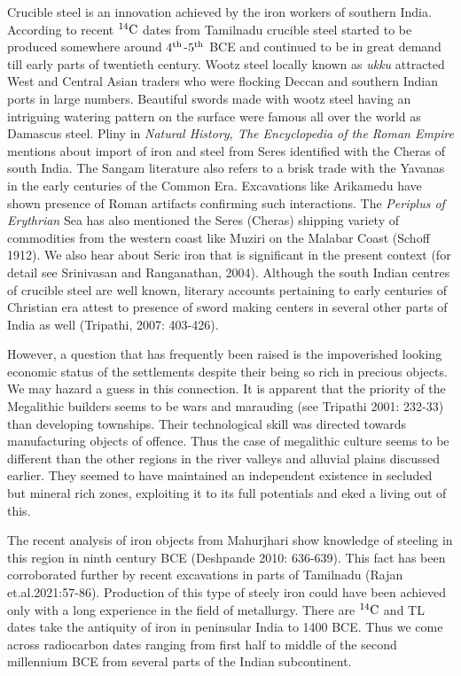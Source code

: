 Crucible steel is an innovation achieved by the iron workers of southern India. According to recent $^{14}{\rm C}$ dates from Tamilnadu crucible steel started to be produced somewhere around $4^{\rm th}$-$5^{\rm th}$ BCE and continued to be in great demand till early parts of twentieth century. Wootz steel locally known as \textit{ukku} attracted West and Central Asian traders who were flocking Deccan and southern Indian ports in large numbers. Beautiful swords made with wootz steel having an intriguing watering pattern on the surface were famous all over the world as Damascus steel. Pliny in \textit{Natural History, The Encyclopedia of the Roman Empire} mentions about import of iron and steel from Seres identified with the Cheras of south India. The Sangam literature also refers to a brisk trade with the Yavanas in the early centuries of the Common Era. Excavations like Arikamedu have shown presence of Roman artifacts confirming such interactions. The \textit{Periplus of Erythrian} Sea has also mentioned the Seres (Cheras) shipping variety of commodities from the western coast like Muziri on the Malabar Coast (Schoff 1912). We also hear about Seric iron that is significant in the present context (for detail see Srinivasan and Ranganathan, 2004). Although the south Indian centres of crucible steel are well known, literary accounts pertaining to early centuries of Christian era attest to presence of sword making centers in several other parts of India as well (Tripathi, 2007: 403-426). 

However, a question that has frequently been raised is the impoverished looking economic status of the settlements despite their being so rich in precious objects. We may hazard a guess in this connection. It is apparent that the priority of the Megalithic builders seems to be wars and marauding (see Tripathi 2001: 232-33) than developing townships. Their technological skill was directed towards manufacturing objects of offence. Thus the case of megalithic culture seems to be different than the other regions in the river valleys and alluvial plains discussed earlier. They seemed to have maintained an independent existence in secluded but mineral rich zones, exploiting it to its full potentials and eked a living out of this.

The recent analysis of iron objects from Mahurjhari show knowledge of steeling in this region in ninth century BCE (Deshpande 2010: 636-639). This fact has been corroborated further by recent excavations in parts of Tamilnadu (Rajan et.al.2021:57-86). Production of this type of steely iron could have been achieved only with a long experience in the field of metallurgy. There are $^{14}{\rm C}$ and TL dates take the antiquity of iron in peninsular India to 1400 BCE.  Thus we come across radiocarbon dates ranging from first half to middle of the second millennium BCE from several parts of the Indian subcontinent.

